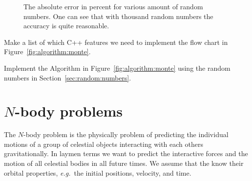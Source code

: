 \documentclass[11pt,fleqn]{book} %
\begin{document}
\begin{figure}[tb]
\centering
{}
\caption{The absolute error in percent for various amount of random numbers. One can see that with thousand random numbers the accuracy is quite reasonable. }
\label{fig:monte:carlo}
\end{figure}

\begin{exercise}
Make a list of which C++ features we need to implement the flow chart in Figure~\ref{fig:algorithm:monte}.
\end{exercise}

\begin{exercise}
Implement the Algorithm in Figure~\ref{fig:algorithm:monte} using the random numbers in Section~\ref{sec:random:numbers}.
\end{exercise}


\chapter{$N$-body problems}
\label{sec:nbody}
The $N$-body problem is the physically problem of predicting the individual motions of a group of celestial objects interacting with each others gravitationally. In laymen terms we want to predict the interactive forces and the motion of all celestial bodies in all future times. We assume that the know their orbital properties, \emph{e.g.}\ the initial positions, velocity, and time.\\
\end{document}
